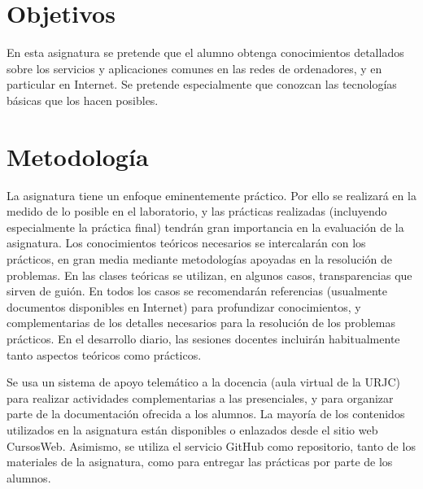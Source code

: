 \documentclass[a4paper,12pt]{article}
\begin{document}
\newpage

\section{Objetivos}

En esta asignatura se pretende que el alumno obtenga conocimientos detallados sobre los servicios y aplicaciones comunes en las redes de ordenadores, y en particular en Internet. Se pretende especialmente que conozcan las tecnologías básicas que los hacen posibles.

\section{Metodología}

La asignatura tiene un enfoque eminentemente práctico. Por ello se realizará en la medido de lo posible en el laboratorio, y las prácticas realizadas (incluyendo especialmente la práctica final) tendrán gran importancia en la evaluación de la asignatura. Los conocimientos teóricos necesarios se intercalarán con los prácticos, en gran media mediante metodologías apoyadas en la resolución de problemas. En las clases teóricas se utilizan, en algunos casos, transparencias que sirven de guión. En todos los casos se recomendarán referencias (usualmente documentos disponibles en Internet) para profundizar conocimientos, y complementarias de los detalles necesarios para la resolución de los problemas prácticos. En el desarrollo diario, las sesiones docentes incluirán habitualmente tanto aspectos teóricos como prácticos.

Se usa un sistema de apoyo telemático a la docencia (aula virtual de la URJC) para realizar actividades complementarias a las presenciales, y para organizar parte de la documentación ofrecida a los alumnos. La mayoría de los contenidos utilizados en la asignatura están disponibles o enlazados desde el sitio web CursosWeb. Asimismo, se utiliza el servicio GitHub como repositorio, tanto de los materiales de la asignatura, como para entregar las prácticas por parte de los alumnos.

\newpage


\end{document}
